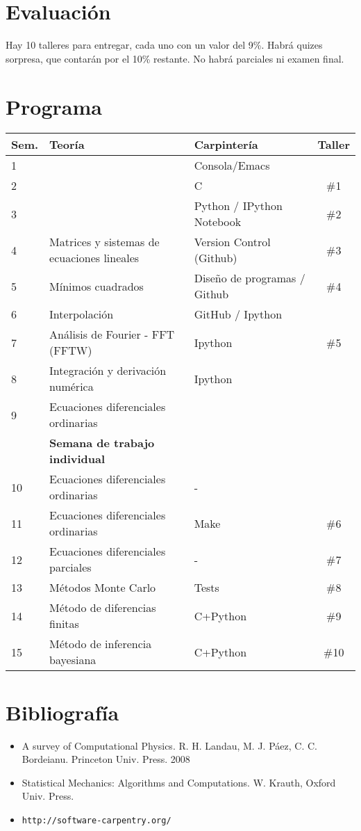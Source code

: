 \documentclass[12pt]{article}
\begin{document}
\section*{Evaluaci\'on}
Hay 10 talleres para entregar, cada uno con un valor del 9\%. Habr\'a  quizes sorpresa, que contar\'an por el 10\% restante. No habr\'a parciales ni examen final.

 
\section*{Programa}

\begin{center}
\begin{tabular}{|l|l|l|c|}
\hline
Sem. & Teor\'ia & Carpinter\'ia & Taller \\\hline
1 & 	&Consola/Emacs &\\
2 & 	&C  & \#1\\
3 & 	&Python / IPython Notebook & \#2\\
4 & Matrices y sistemas de ecuaciones lineales  & Version Control (Github) &\#3\\
5 & M\'inimos cuadrados & Dise\~no de programas / Github& \#4\\
6 & Interpolaci\'on & GitHub / Ipython& \\
7 & An\'alisis de Fourier - FFT  (FFTW)&  Ipython & \#5 \\
8 & Integraci\'on y derivaci\'on num\'erica & Ipython &\\
9 & Ecuaciones diferenciales ordinarias & &\\
 & {\bf Semana de trabajo individual} & &\\
10 & Ecuaciones diferenciales ordinarias &  - & \\
11 & Ecuaciones diferenciales ordinarias &  Make & \#6\\
12 & Ecuaciones diferenciales parciales &  - &\#7\\
13 & M\'etodos Monte Carlo &   Tests &\#8\\
14 & M\'etodo de diferencias finitas & C+Python &\#9\\
15 & M\'etodo de inferencia bayesiana& C+Python &\#10\\
\hline
\end{tabular}
\end{center}


\section*{Bibliograf\'ia}
\begin{itemize}
\item
A survey of Computational Physics. R. H. Landau, M. J. P\'aez, C. C.
Bordeianu. Princeton Univ. Press. 2008 
\item
Statistical Mechanics: Algorithms and Computations. W. Krauth, Oxford Univ. Press. 
\item\verb"http://software-carpentry.org/"
\end{itemize}

 
\end{document}
